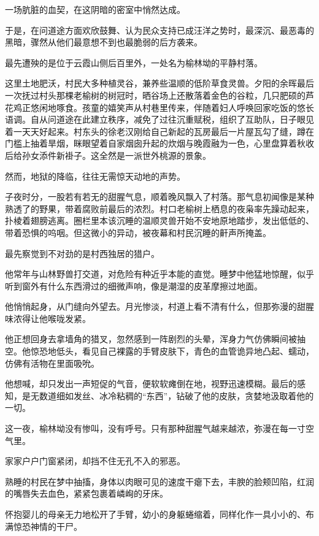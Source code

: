 一场肮脏的血契，在这阴暗的密室中悄然达成。

\vspace{2em}

于是，在问道途方面欢欣鼓舞、认为民众支持已成汪洋之势时，最深沉、最恶毒的黑暗，骤然从他们最意想不到也最脆弱的后方袭来。

最先遭殃的是位于云霞山侧后百里外，一处名为榆林坳的平静村落。

这里土地肥沃，村民大多种植灵谷，兼养些温顺的低阶草食灵兽。夕阳的余晖最后一次抚过村头那棵老榆树的树冠时，晒谷场上还散落着金色的谷粒，几只肥硕的芦花鸡正悠闲地啄食。孩童的嬉笑声从村巷里传来，伴随着妇人呼唤回家吃饭的悠长语调。自从问道途在此建立秩序，减免了过往沉重赋税，组织了互助队，日子眼见着一天天好起来。村东头的徐老汉刚给自己新起的瓦房最后一片屋瓦勾了缝，蹲在门槛上抽着旱烟，眯眼望着自家烟囱升起的炊烟与晚霞融为一色，心里盘算着秋收后给孙女添件新褂子。这全然是一派世外桃源的景象。

然而，地狱的降临，往往无需惊天动地的声势。

子夜时分，一股若有若无的甜腥气息，顺着晚风飘入了村落。那气息初闻像是某种熟透了的野果，带着腐败前最后的浓烈。村口老榆树上栖息的夜枭率先躁动起来，扑棱着翅膀逃离。圈栏里本该沉睡的温顺灵兽开始不安地原地踏步，发出低低的、带着恐惧的呜咽。但这微小的异动，被夜幕和村民沉睡的鼾声所掩盖。

最先察觉到不对劲的是村西独居的猎户。

他常年与山林野兽打交道，对危险有种近乎本能的直觉。睡梦中他猛地惊醒，似乎听到窗外有什么东西滑过的细微声响，像是潮湿的皮革摩擦过地面。

他悄悄起身，从门缝向外望去。月光惨淡，村道上看不清有什么，但那弥漫的甜腥味浓得让他喉咙发紧。

他正想回身去拿墙角的猎叉，忽然感到一阵剧烈的头晕，浑身力气仿佛瞬间被抽空。他惊恐地低头，看见自己裸露的手臂皮肤下，青色的血管诡异地凸起、蠕动，仿佛有活物在里面吸吮。

他想喊，却只发出一声短促的气音，便软软瘫倒在地，视野迅速模糊。最后的感知，是无数道细如发丝、冰冷粘稠的“东西”，钻破了他的皮肤，贪婪地汲取着他的一切。

这一夜，榆林坳没有惨叫，没有呼号。只有那种甜腥气越来越浓，弥漫在每一寸空气里。

家家户户门窗紧闭，却挡不住无孔不入的邪恶。

熟睡的村民在梦中抽搐，身体以肉眼可见的速度干瘪下去，丰腴的脸颊凹陷，红润的嘴唇失去血色，紧紧包裹着嶙峋的牙床。

怀抱婴儿的母亲无力地松开了手臂，幼小的身躯蜷缩着，同样化作一具小小的、布满惊恐神情的干尸。

